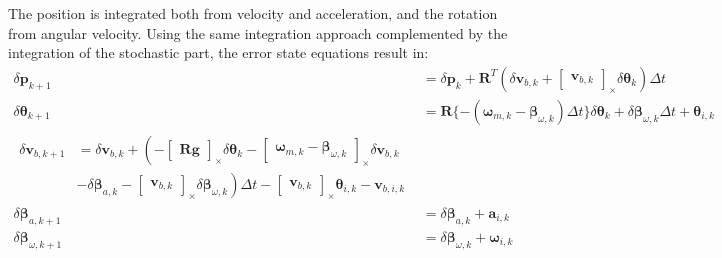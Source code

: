 The position is integrated both from velocity and acceleration, and the rotation from angular velocity. Using the same integration approach complemented by the integration of the stochastic part, the error state equations result in:
\begin{subequations}
\begin{align}
    \delta\mathbf{p}_{k+1}&=\delta\mathbf{p}_{k}+ \mathbf{R}^T\left(\delta \mathbf{v}_{b,k} + \begin{bmatrix} \mathbf{v}_{b,k} \end{bmatrix}_\times \delta\boldsymbol{\theta}_k\right)\Delta t \\
    \delta\boldsymbol{\theta}_{k+1}&=
    \mathbf{R}\{-(\boldsymbol{\omega}_{m,k}-\boldsymbol{\beta}_{\omega,k})\Delta t\}\delta\boldsymbol{\theta}_k +\delta\boldsymbol{\beta}_{\omega,k}\Delta t +\boldsymbol{\theta}_{i,k} \\
    \begin{split}
    \delta \mathbf{v}_{b,k+1}&=\delta \mathbf{v}_{b,k}+\left(-\begin{bmatrix} \mathbf{R}\mathbf{g} \end{bmatrix}_\times\delta\boldsymbol{\theta}_k - \begin{bmatrix}\boldsymbol{\omega}_{m,k}-\boldsymbol{\beta}_{\omega,k} \end{bmatrix}_\times\delta \mathbf{v}_{b,k} \right.\\ & \left. -\delta\boldsymbol{\beta}_{a,k}-\begin{bmatrix}\mathbf{v}_{b,k} \end{bmatrix}_\times \delta\boldsymbol{\beta}_{\omega,k}\right)
    \Delta t -\begin{bmatrix}
        \mathbf{v}_{b,k}
    \end{bmatrix}_\times\boldsymbol{\theta}_{i,k}-\mathbf{v}_{b,i,k}
    \end{split} \\
    \delta\boldsymbol{\beta}_{a,k+1}&=\delta\boldsymbol{\beta}_{a,k}+\mathbf{a}_{i,k} \\
    \delta\boldsymbol{\beta}_{\omega,k+1}&=\delta\boldsymbol{\beta}_{\omega,k}+\boldsymbol{ \omega}_{i,k}
\end{align}\label{eq:error-eq-discrete}
\end{subequations}

